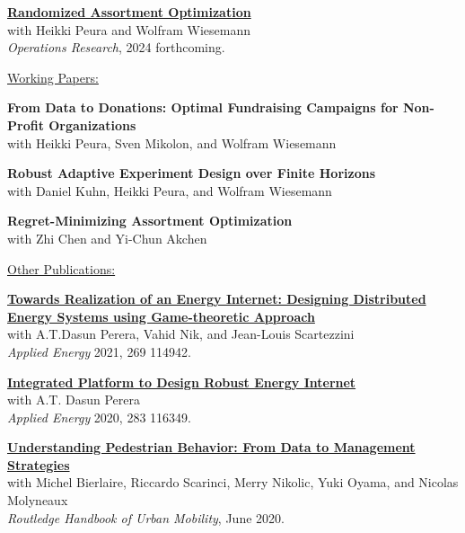 \documentclass[letterpaper,11pt]{article}
\begin{document}
\begin{myitemize}
%
	\item \href{https://doi.org/10.1287/opre.2022.0129}{\bf  Randomized Assortment Optimization}\\{with Heikki Peura and Wolfram Wiesemann}\\ {{\it Operations Research},  2024 forthcoming.}
\end{myitemize}

\underline{\sc \small Working Papers:} {} %
\begin{myitemize}
		\item {\bf From Data to Donations: Optimal Fundraising Campaigns for Non-Profit Organizations}\\{with Heikki Peura, Sven Mikolon, and Wolfram Wiesemann}
       \item {\bf  Robust Adaptive Experiment Design over Finite Horizons}\\ {with Daniel Kuhn, Heikki Peura, and Wolfram Wiesemann}
       \item {\bf Regret-Minimizing Assortment Optimization}\\{with Zhi Chen and Yi-Chun Akchen }
\end{myitemize}
\underline{\sc \small Other Publications:}

\begin{myitemize}
	\item \href{https://doi.org/10.1016/j.apenergy.2020.116349}{\bf  Towards Realization
of an Energy Internet: Designing Distributed Energy Systems using Game-theoretic Approach}\\{with A.T.Dasun Perera, Vahid Nik,  and Jean-Louis Scartezzini}\\ {{\it Applied Energy} 2021,  269 114942.}
	\item \href{https://doi.org/10.1016/j.apenergy.2020.114942}{\bf  Integrated Platform to Design Robust Energy Internet}\\{with A.T. Dasun Perera}\\ {{\it Applied Energy} 2020,  283 116349.}
	\item \href{https://doi.org/10.4324/9781351058759}{\bf Understanding Pedestrian Behavior: From Data to Management Strategies}\\ {with  Michel Bierlaire,  Riccardo Scarinci, Merry Nikolic, Yuki Oyama,  and Nicolas Molyneaux}\\ {{\it Routledge Handbook of Urban Mobility},  June 2020.}
\end{myitemize}
\end{document}
